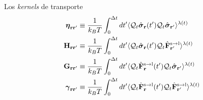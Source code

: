 \documentclass{beamer}
\begin{document}
\begin{frame}{Los \textit{kernels} de transporte}
\begin{align}
  \boldsymbol{\eta}_{{\bf  r}{\bf r}'} &\equiv
\frac{1}{k_BT}\int_0^{\Delta t} dt'\langle 
{\cal Q}_t\hat{\boldsymbol{\sigma}}_{{\bf r}}(t')
{\cal Q}_t\hat{\boldsymbol{\sigma}}_{{\bf r}'}\rangle^{\lambda(t)}
\nonumber \\
{\bf H}_{{\bf r}{\bf r}'}&\equiv\frac{1}{k_BT}\int_0^{\Delta t} dt'
\langle {\cal Q}_t\hat{\boldsymbol{\sigma}}_{{\bf r}}(t')
{\cal Q}_t\hat{\bf F}^{\rm s\to l}_{{\bf r}'}\rangle^{\lambda(t)}
\nonumber\\
{\bf G}_{{\bf r}{\bf r}'}&\equiv\frac{1}{k_BT}\int_0^{\Delta t} dt'
\langle {\cal Q}_t\hat{\bf F}^{\rm s\to l}_{{\bf r}}(t')
{\cal Q}_t\hat{\boldsymbol{\sigma}}_{{\bf r}'}\rangle^{\lambda(t)}
\nonumber\\
\boldsymbol{\gamma}_{{\bf  r}{\bf r}'}&\equiv\frac{1}{k_BT}\int_0^{\Delta t} dt'
\langle 
{\cal Q}_t\hat{\bf F}^{\rm s\to l}_{{\bf r}}(t')
{\cal Q}_t\hat{\bf F}^{\rm s\to l}_{{\bf r}'}\rangle^{\lambda(t)}
\nonumber
\end{align}
\end{frame}
\end{document}
